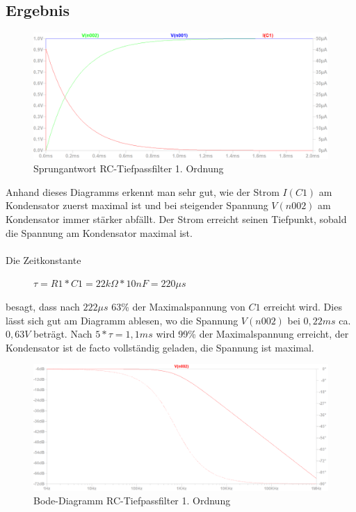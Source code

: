 \documentclass[12pt,a4paper,titlepage]{article}
\begin{document}
\subsection{Ergebnis}

\begin{figure}[H]
  \centering
  \includegraphics[width=150mm]{sprungantwort_filter01.png}
  \caption{Sprungantwort RC-Tiefpassfilter 1. Ordnung}
\end{figure}

Anhand dieses Diagramms erkennt man sehr gut, wie der Strom $I(C1)$ am Kondensator zuerst maximal ist und bei steigender Spannung $V(n002)$ am Kondensator immer stärker abfällt. Der Strom erreicht seinen Tiefpunkt, sobald die Spannung am Kondensator maximal ist.\\\\
Die Zeitkonstante
\begin{figure}[H]
  \centering
  $\tau = R1*C1 = 22k\Omega*10nF = 220\mu s$
\end{figure}
\noindent besagt, dass nach $222\mu s$ 63\% der Maximalspannung von $C1$ erreicht wird. Dies lässt sich gut am Diagramm ablesen, wo die Spannung $V(n002)$ bei $0,22ms$ ca. $0,63V$ beträgt. Nach $5*\tau = 1,1ms$ wird 99\% der Maximalspannung erreicht, der Kondensator ist de facto vollständig geladen, die Spannung ist maximal.

\begin{figure}[H]
  \centering
  \includegraphics[width=150mm]{bode_filter01.png}
  \caption{Bode-Diagramm RC-Tiefpassfilter 1. Ordnung}
\end{figure}
\end{document}
